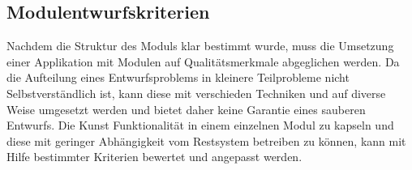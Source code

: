   \subsection{Modulentwurfskriterien}
    Nachdem die Struktur des Moduls klar bestimmt wurde, muss die Umsetzung einer Applikation mit Modulen auf Qualitätsmerkmale abgeglichen werden. 
    Da die Aufteilung eines Entwurfsproblems in kleinere Teilprobleme nicht Selbstverständlich ist, kann diese mit verschieden Techniken und auf diverse Weise umgesetzt werden und bietet daher keine Garantie eines sauberen Entwurfs. 
    Die Kunst Funktionalität in einem einzelnen Modul zu kapseln und diese mit geringer Abhängigkeit vom Restsystem betreiben zu können, kann mit Hilfe bestimmter Kriterien bewertet und angepasst werden.
    
